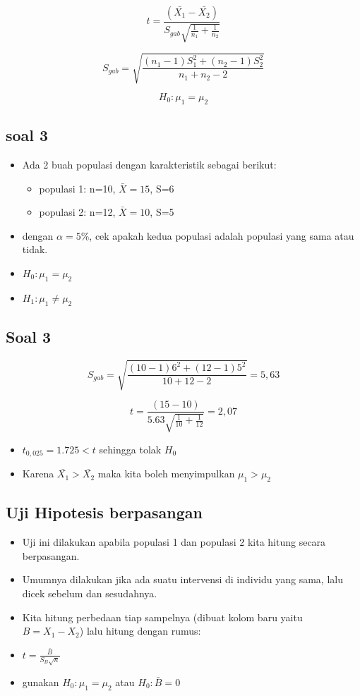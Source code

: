 \documentclass[
  letterpaper,
  DIV=11,
  numbers=noendperiod]{scrartcl}
\begin{document}
\[
t=\frac{(\bar{X_1}-\bar{X_2})}{S_{gab}\sqrt{\frac{1}{n_1}+\frac{1}{n_2}}}
\]

\[
S_{gab}=\sqrt{\frac{(n_1-1)S_1^2+(n_2-1)S_2^2}{n_1+n_2-2}}
\]

\[
H_0: \mu_1=\mu_2
\]

\hypertarget{soal-3-1}{%
\subsection{soal 3}\label{soal-3-1}}

\begin{itemize}
\item
  Ada 2 buah populasi dengan karakteristik sebagai berikut:

  \begin{itemize}
  \item
    populasi 1: n=10, \(\bar{X}=15\), S=6
  \item
    populasi 2: n=12, \(\bar{X}=10\), S=5
  \end{itemize}
\item
  dengan \(\alpha=5\%\), cek apakah kedua populasi adalah populasi yang
  sama atau tidak.
\item
  \(H_0: \mu_1 = \mu_2\)
\item
  \(H_1: \mu_1 \neq \mu_2\)
\end{itemize}

\hypertarget{soal-3-2}{%
\subsection{Soal 3}\label{soal-3-2}}

\[
S_{gab}=\sqrt{\frac{(10-1)6^2+(12-1)5^2}{10+12-2}}= 5,63
\]

\[
t=\frac{(15-10)}{5.63\sqrt{\frac{1}{10}+\frac{1}{12}}}=2,07
\]

\begin{itemize}
\item
  \(t_{0,025}=1.725 < t\) sehingga tolak \(H_0\)
\item
  Karena \(\bar{X_1}>\bar{X_2}\) maka kita boleh menyimpulkan
  \(\mu_1>\mu_2\)
\end{itemize}

\hypertarget{uji-hipotesis-berpasangan}{%
\subsection{Uji Hipotesis berpasangan}\label{uji-hipotesis-berpasangan}}

\begin{itemize}
\item
  Uji ini dilakukan apabila populasi 1 dan populasi 2 kita hitung secara
  berpasangan.
\item
  Umumnya dilakukan jika ada suatu intervensi di individu yang sama,
  lalu dicek sebelum dan sesudahnya.
\item
  Kita hitung perbedaan tiap sampelnya (dibuat kolom baru yaitu
  \(B=X_1-X_2\)) lalu hitung dengan rumus:
\item
  \(t=\frac{\bar{B}}{S_B\sqrt{n}}\)
\item
  gunakan \(H_0: \mu_1=\mu_2\) atau \(H_0: \bar{B}=0\)
\end{itemize}
\end{document}
